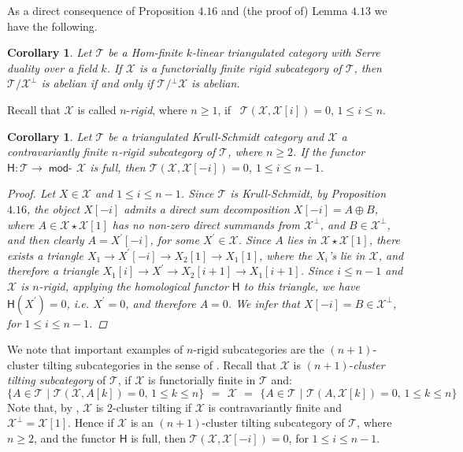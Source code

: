 \documentclass[oneside, a4paper,reqno]{amsart}
\numberwithin{equation}{section}
\newtheorem{cor}[thm]{Corollary}
\theoremstyle{definition}
\begin{document}
As a direct consequence of  Proposition $4.16$ and (the proof of) Lemma $4.13$ we have the following.

\begin{cor} Let ${\mathcal T}$ be a Hom-finite $k$-linear triangulated category with Serre duality over a field $k$. If ${\mathcal X}$ is a functorially finite rigid subcategory of ${\mathcal T}$, then ${\mathcal T}/{\mathcal X}^{\bot}$ is abelian if and only if ${\mathcal T}/{^{\bot}}{\mathcal X}$ is abelian. 
\end{cor}

Recall  that ${\mathcal X}$ is called $n$-{\em rigid}, where $n \geq 1$, if \, ${\mathcal T}({\mathcal X},{\mathcal X}[i]) = 0$, $1\leq i \leq n$. 

\begin{cor} Let ${\mathcal T}$ be a triangulated Krull-Schmidt category and ${\mathcal X}$ a contravariantly finite $n$-rigid subcategory of ${\mathcal T}$, where $n \geq 2$. If the functor $\mathsf{H} \colon {\mathcal T} {\longrightarrow} \operatorname*{\mathsf{mod}-\!}{\mathcal X}$ is full, then ${\mathcal T}({\mathcal X},{\mathcal X}[-i]) = 0$, $1\leq i \leq n-1$. 
\begin{proof} Let $X \in {\mathcal X}$ and $1\leq i \leq n-1$. Since ${\mathcal T}$ is Krull-Schmidt, by Proposition $4.16$, the object $X[-i]$  admits a direct sum decomposition $X[-i] = A \oplus B$, where $A \in {\mathcal X}\star {\mathcal X}[1]$ has no non-zero direct summands from ${\mathcal X}^{\bot}$, and $B \in {\mathcal X}^{\bot}$, and then clearly  $A = X^{\prime}[-i]$, for some $X^{\prime} \in {\mathcal X}$. Since $A$ lies in ${\mathcal X}\star{\mathcal X}[1]$, there exists a triangle  $X_{1} {\longrightarrow} X^{\prime}[-i] {\longrightarrow} X_{2}[1] {\longrightarrow} X_{1}[1]$, where the $X_{i}$'s lie in ${\mathcal X}$, and therefore a triangle 
$X_{1}[i] {\longrightarrow} X^{\prime} {\longrightarrow} X_{2}[i+1] {\longrightarrow} X_{1}[i+1]$. Since $i \leq n-1$ and ${\mathcal X}$ is $n$-rigid, applying the homological functor $\mathsf{H}$ to this triangle, we have $\mathsf{H}(X^{\prime}) = 0$, i.e. $X^{\prime} = 0$, and therefore $A = 0$. We infer that $X[-i] = B \in {\mathcal X}^{\bot}$, for $1\leq i \leq n-1$. 
\end{proof}
\end{cor} 

We note  that important examples of $n$-rigid subcategories are the $(n+1)$-cluster tilting subcategories in the sense of \cite{KR1, IY}.  Recall that ${\mathcal X}$ is $(n+1)$-{\em cluster tilting subcategory} of ${\mathcal T}$, if  ${\mathcal X}$ is functorially finite in ${\mathcal T}$ and:
\[
\big\{A \in {\mathcal T} \,\, | \,\, {\mathcal T}({\mathcal X},A[k]) = 0, \, 1\leq k \leq n\big\} \,\ = \,\ {\mathcal X} \,\  = \,\ \big\{A \in {\mathcal T} \,\, | \,\, {\mathcal T}(A,{\mathcal X}[k]) = 0, \, 1\leq k \leq n\big\}
\]
Note that, by \cite{KZ}, ${\mathcal X}$ is $2$-cluster tilting if ${\mathcal X}$ is contravariantly finite and ${\mathcal X}^{\bot} = {\mathcal X}[1]$. Hence if ${\mathcal X}$ is an $(n+1)$-cluster tilting subcategory of ${\mathcal T}$, where $n\geq 2$, and the functor $\mathsf{H}$ is full, then ${\mathcal T}({\mathcal X},{\mathcal X}[-i]) = 0$, for $1\leq i \leq n-1$. 
\end{document}
